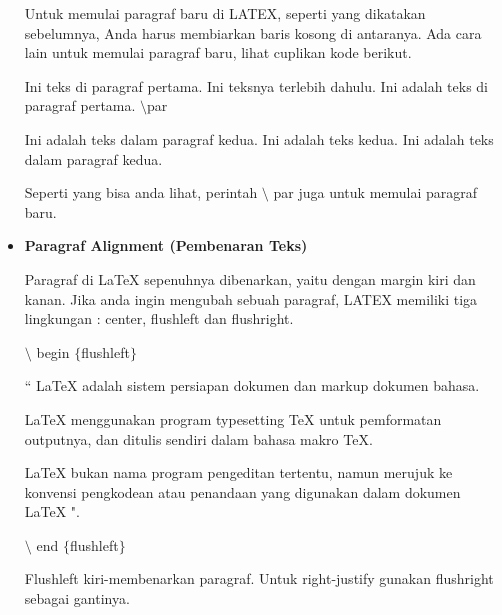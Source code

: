 \begin{itemize}
Untuk memulai paragraf baru di LATEX, seperti yang dikatakan sebelumnya, Anda harus membiarkan baris kosong di antaranya. Ada cara lain untuk memulai paragraf baru, lihat cuplikan kode berikut.\par

Ini teks di paragraf pertama. Ini teksnya terlebih dahulu. Ini adalah teks di paragraf pertama. $\setminus$par\par

Ini adalah teks dalam paragraf kedua. Ini adalah teks kedua. Ini adalah teks dalam paragraf kedua.\par

Seperti yang bisa anda lihat, perintah $\setminus$ par juga untuk memulai paragraf baru.\par

\vspace{10pt}
	\item {\fontsize{14pt}{14pt}\selectfont \textbf{Paragraf Alignment (Pembenaran Teks)}}\par

Paragraf di LaTeX sepenuhnya dibenarkan, yaitu dengan margin kiri dan kanan. Jika anda ingin mengubah sebuah paragraf, LATEX memiliki tiga lingkungan : center, flushleft dan flushright.\par

\hspace*{0.5in}$\setminus$ begin $ \{ $flushleft$ \} $\par

\hspace*{0.5in}`` LaTeX adalah sistem persiapan dokumen dan markup dokumen bahasa. \par

\hspace*{0.5in}LaTeX menggunakan program typesetting TeX untuk pemformatan outputnya, dan ditulis \hspace*{0.5in}sendiri dalam bahasa makro TeX.\par

\hspace*{0.5in}LaTeX bukan nama program pengeditan tertentu, namun merujuk ke konvensi pengkodean \hspace*{0.5in}atau penandaan yang digunakan dalam dokumen LaTeX ".\par

\hspace*{0.5in}$\setminus$ end $ \{ $flushleft$ \} $\par

Flushleft kiri-membenarkan paragraf. Untuk right-justify gunakan flushright sebagai gantinya.\par


\end{itemize}
